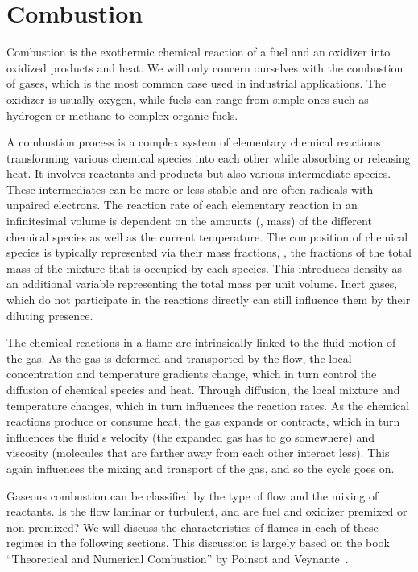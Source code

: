 \section{Combustion} %
\label{sec:combustion}
%
Combustion is the exothermic chemical reaction of a fuel and an oxidizer into
oxidized products and heat.
%
We will only concern ourselves with the combustion of gases, which is the
most common case used in industrial applications.
%
The oxidizer is usually oxygen, while fuels can range from simple ones such as
hydrogen or methane to complex organic fuels.
%

%
A combustion process is a complex system of elementary chemical reactions
transforming various chemical species into each other while absorbing or
releasing heat.
%
It involves reactants and products but also various intermediate species.
%
These intermediates can be more or less stable and are often radicals with
unpaired electrons.
%
The reaction rate of each elementary reaction in an infinitesimal volume is
dependent on the amounts (\ie{}, mass) of the different chemical species as well
as the current temperature.
%
The composition of chemical species is typically represented via their mass
fractions, \ie{}, the fractions of the total mass of the mixture that is occupied
by each species.
%
This introduces density as an additional variable representing the total mass
per unit volume.
%
Inert gases, which do not participate in the reactions directly can still
influence them by their diluting presence.
%

%
The chemical reactions in a flame are intrinsically linked to the fluid motion
of the gas.
%
As the gas is deformed and transported by the flow, the local concentration and
temperature gradients change, which in turn control the diffusion of chemical
species and heat.
%
Through diffusion, the local mixture and temperature changes, which in turn
influences the reaction rates.
%
As the chemical reactions produce or consume heat, the gas expands or contracts,
which in turn influences the fluid's velocity (the expanded gas has to go
somewhere) and viscosity (molecules that are farther away from each other
interact less).
%
This again influences the mixing and transport of the gas, and so the cycle goes
on.
%

%
Gaseous combustion can be classified by the type of flow and the mixing of
reactants.
%
Is the flow laminar or turbulent, and are fuel and oxidizer premixed or
non-premixed?
%
We will discuss the characteristics of flames in each of these regimes in the
following sections.
%
This discussion is largely based on the book ``Theoretical and Numerical
Combustion'' by Poinsot and Veynante~\cite{Poinsot2012}.
%
